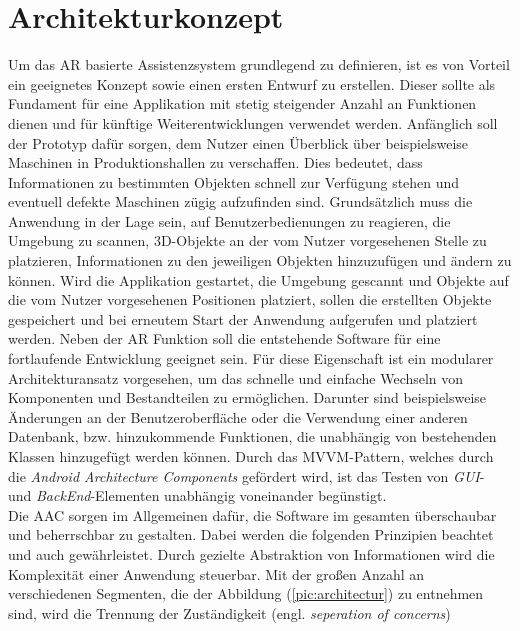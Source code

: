 \section{Architekturkonzept}
\label{chap:Architekturkonzept}
Um das \acl{AR} basierte Assistenzsystem grundlegend zu definieren, ist es von Vorteil ein geeignetes Konzept sowie einen ersten Entwurf zu 
erstellen. Dieser sollte als Fundament für eine Applikation mit stetig steigender Anzahl an Funktionen dienen und für künftige Weiterentwicklungen 
verwendet werden. Anfänglich soll der Prototyp dafür sorgen, dem Nutzer einen Überblick über beispielsweise Maschinen in Produktionshallen zu 
verschaffen. Dies bedeutet, dass Informationen zu bestimmten Objekten schnell zur Verfügung stehen und eventuell defekte Maschinen zügig 
aufzufinden sind. Grundsätzlich muss die Anwendung in der Lage sein, auf Benutzerbedienungen zu reagieren, die Umgebung zu scannen, 3D-Objekte 
an der vom Nutzer vorgesehenen Stelle zu platzieren, Informationen zu den jeweiligen Objekten hinzuzufügen und ändern zu können. Wird die 
Applikation gestartet, die Umgebung gescannt und Objekte auf die vom Nutzer vorgesehenen Positionen platziert, sollen die erstellten Objekte 
gespeichert und bei erneutem Start der Anwendung aufgerufen und platziert werden. Neben der \acl{AR} Funktion soll die %
entstehende Software für eine fortlaufende Entwicklung geeignet sein. Für diese Eigenschaft ist ein modularer Architekturansatz vorgesehen, 
um das schnelle und einfache Wechseln von Komponenten und Bestandteilen zu ermöglichen. Darunter sind beispielsweise Änderungen an der 
Benutzeroberfläche oder die Verwendung einer anderen Datenbank, bzw. hinzukommende Funktionen, die unabhängig von bestehenden Klassen 
hinzugefügt werden können. Durch das \acs{MVVM}-Pattern, welches durch die \textit{Android Architecture Components} gefördert wird, ist 
das Testen von \textit{\acs{GUI}}- und \textit{BackEnd}-Elementen unabhängig voneinander begünstigt. 
\\ 
Die \acs{AAC} sorgen im Allgemeinen 
dafür, die Software im gesamten überschaubar und beherrschbar zu gestalten. Dabei werden die folgenden Prinzipien beachtet und auch gewährleistet. 
Durch gezielte Abstraktion von Informationen wird die Komplexität einer Anwendung steuerbar. Mit der großen Anzahl an verschiedenen 
Segmenten, die der Abbildung (\ref{pic:architectur}) zu entnehmen sind, wird die Trennung der Zuständigkeit (engl. \textit{seperation of concerns}) 
